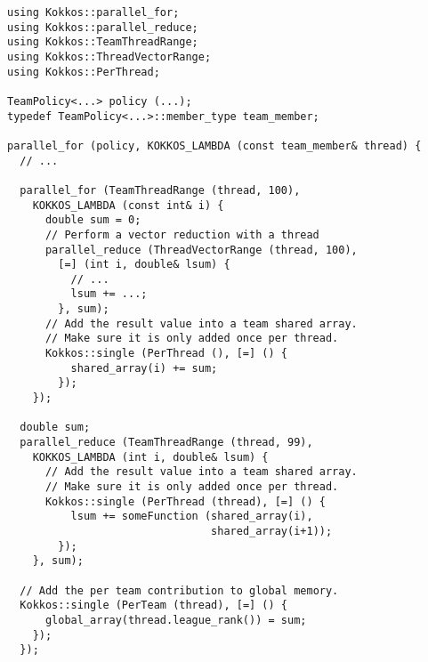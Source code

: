 \begin{lstlisting}
using Kokkos::parallel_for;
using Kokkos::parallel_reduce;
using Kokkos::TeamThreadRange;
using Kokkos::ThreadVectorRange;
using Kokkos::PerThread;

TeamPolicy<...> policy (...);
typedef TeamPolicy<...>::member_type team_member;

parallel_for (policy, KOKKOS_LAMBDA (const team_member& thread) {
  // ...

  parallel_for (TeamThreadRange (thread, 100), 
    KOKKOS_LAMBDA (const int& i) {
      double sum = 0;
      // Perform a vector reduction with a thread
      parallel_reduce (ThreadVectorRange (thread, 100), 
        [=] (int i, double& lsum) {
          // ...
          lsum += ...;
        }, sum);
      // Add the result value into a team shared array.
      // Make sure it is only added once per thread.
      Kokkos::single (PerThread (), [=] () {
          shared_array(i) += sum;
        });
    });
  
  double sum;
  parallel_reduce (TeamThreadRange (thread, 99), 
    KOKKOS_LAMBDA (int i, double& lsum) {
      // Add the result value into a team shared array.
      // Make sure it is only added once per thread.
      Kokkos::single (PerThread (thread), [=] () {
          lsum += someFunction (shared_array(i), 
                                shared_array(i+1));
        });
    }, sum);
  
  // Add the per team contribution to global memory.
  Kokkos::single (PerTeam (thread), [=] () {
      global_array(thread.league_rank()) = sum;
    });
  });
\end{lstlisting}
 

